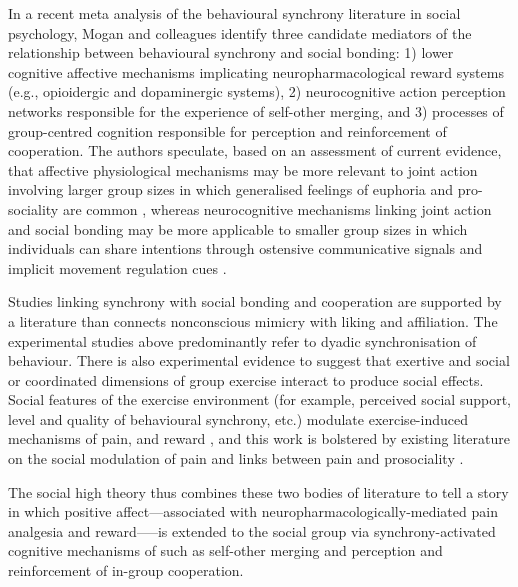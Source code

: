 \begin{CJK}{UTF8}{gbsn}
In a recent meta analysis of the behavioural synchrony literature in social psychology, Mogan and colleagues \textcite{Mogan2017} identify three candidate mediators of the relationship between behavioural synchrony and social bonding: 1) lower cognitive affective mechanisms implicating neuropharmacological reward systems (e.g., opioidergic and dopaminergic systems), 2) neurocognitive action perception networks responsible for the experience of self-other merging, and 3) processes of group-centred cognition responsible for perception and reinforcement of cooperation.  The authors speculate, based on an assessment of current evidence, that affective physiological mechanisms may be more relevant to joint action involving larger group sizes in which generalised feelings of euphoria and pro-sociality are common \citep[][e.g., mass religious rituals or music festivals]{Weinstein2016}, whereas neurocognitive mechanisms linking joint action and social bonding may be more applicable to smaller group sizes in which individuals can share intentions through ostensive communicative signals and implicit movement regulation cues \citep{Semin2008,Frith2010}.

Studies linking synchrony with social bonding and cooperation are supported by a literature than connects nonconscious mimicry with liking and affiliation\citep{VanBaaren2009}.  The experimental studies above predominantly refer to dyadic synchronisation of behaviour.   There is also experimental evidence to suggest that exertive and social or coordinated dimensions of group exercise interact to produce social effects.  Social features of the exercise environment (for example, perceived social support, level and quality of behavioural synchrony, etc.) modulate exercise-induced mechanisms of pain, and reward \citep{Cohen2009,Sullivan2014,Tarr2015,Davis2015,Weinstein2016}, and this work is bolstered by existing literature on the social modulation of pain \citep{Eisenberger2012a} and links between pain and prosociality \citep{Bastian2014a}.


The social high theory thus combines these two bodies of literature to tell a story in which positive affect---associated with neuropharmacologically-mediated pain analgesia and reward—--is extended to the social group via synchrony-activated cognitive mechanisms of such as self-other merging and perception and reinforcement of in-group cooperation.


\end{CJK}
